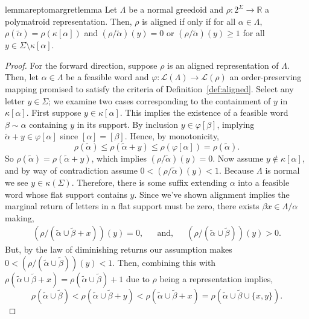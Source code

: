 \documentclass[11pt]{article}
\newcommand{\univ}{\Sigma}
\newcommand{\glang}{\Lambda}
\providecommand{\L}{}
\renewcommand{\L}{\mathscr{L}}
\begin{document}
\begin{restatable}{lemma}{reptomargretlemma}\label{lem:aligned-mr}
    Let $\glang$ be a normal greedoid and $\rho:2^\univ\to\mathbb{R}$ a polymatroid representation.
    Then, $\rho$ is aligned if only if for all $\alpha \in\glang$, $\rho(\widetilde{\alpha}) = \rho(\kappa[\alpha])$ and $(\rho/\widetilde{\alpha})(y) = 0$ or $(\rho/\widetilde{\alpha})(y) \geq 1$ for all $y \in\univ\setminus\kappa[\alpha]$.
\end{restatable}
\begin{proof} 
    For the forward direction, suppose $\rho$ is an aligned representation of $\glang$.
    Then, let $\alpha \in \glang$ be a feasible word and $\varphi:\L(\glang)\to\L(\rho)$ an order-preserving mapping promised to satisfy the criteria of Definition~\ref{def:aligned}.
    Select any letter $y \in\univ$; we examine two cases corresponding to the containment of $y$ in $\kappa[\alpha]$.
    First suppose $y \in \kappa[\alpha]$.
    This implies the existence of a feasible word $\beta \sim \alpha$ containing $y$ in its support.
    By inclusion $y \in \varphi[\beta]$, implying $\widetilde{\alpha} + y \in \varphi[\alpha]$ since $[\alpha] = [\beta]$.
    Hence, by monotonicity,
    \[ \rho(\widetilde{\alpha}) \leq \rho(\widetilde{\alpha} + y) \leq \rho(\varphi[\alpha]) = \rho(\widetilde{\alpha}). \]
    So $\rho(\widetilde{\alpha}) = \rho(\widetilde{\alpha} + y)$, which implies $(\rho/\widetilde{\alpha})(y) = 0$.
    Now assume $y \notin \kappa[\alpha]$,
    and by way of contradiction assume $0 < (\rho/\widetilde{\alpha})(y) < 1$.
    Because $\glang$ is normal we see $y \in \kappa(\univ)$.
    Therefore, there is some suffix extending $\alpha$ into a feasible word whose flat support contains $y$. 
    Since we've shown alignment implies the marginal return of letters in a flat support must be zero, there exists $\beta x\in\glang/\alpha$ making,
    \begin{align*}
        (\rho/(\widetilde{\alpha}\cup \widetilde{\beta} + x))(y) = 0,&&\text{and,}&&(\rho/(\widetilde{\alpha}\cup\widetilde{\beta}))(y) > 0.
    \end{align*}
    But, by the law of diminishing returns our assumption makes $0<(\rho/(\widetilde{\alpha}\cup\widetilde{\beta}))(y) < 1$.
    Then, combining this with $\rho(\widetilde{\alpha}\cup\widetilde{\beta} + x) = \rho(\widetilde{\alpha}\cup\widetilde{\beta}) + 1$ due to $\rho$ being a representation implies,
    \[
        \rho(\widetilde{\alpha} \cup \widetilde{\beta}) < \rho(\widetilde{\alpha} \cup\widetilde{\beta} + y) < \rho(\widetilde{\alpha} \cup\widetilde{\beta} + x) = \rho(\widetilde{\alpha} \cup \widetilde{\beta} \cup \{x, y\}). 
\]
\end{proof}
\end{document}
